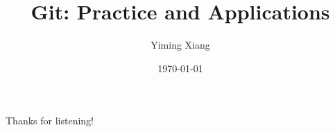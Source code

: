 \documentclass[aspectratio=169]{beamer}
\title{Git: Practice and Applications}
\author{Yiming Xiang}
\institute{UM-SJTU Joint Institute}
\date{\today}
\begin{document}
\frame{\titlepage}

\begin{frame}
    \Huge{\textcolor{UMBlue}{Thanks for listening!}}
\end{frame}
\end{document}
